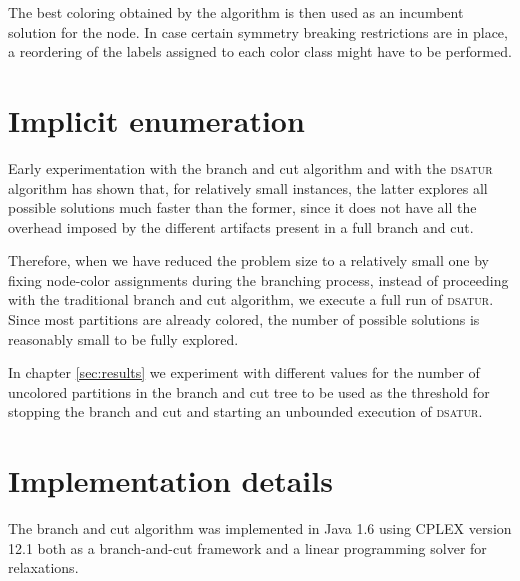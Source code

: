 The best coloring obtained by the algorithm is then used as an incumbent solution for the node. In case certain symmetry breaking restrictions are in place, a reordering of the labels assigned to each color class might have to be performed.

\section{Implicit enumeration}
\label{subsec:alg:implicit}

Early experimentation with the branch and cut algorithm and with the \textsc{dsatur} algorithm has shown that, for relatively small instances, the latter explores all possible solutions much faster than the former, since it does not have all the overhead imposed by the different artifacts present in a full branch and cut.

Therefore, when we have reduced the problem size to a relatively small one by fixing node-color assignments during the branching process, instead of proceeding with the traditional branch and cut algorithm, we execute a full run of \textsc{dsatur}. Since most partitions are already colored, the number of possible solutions is reasonably small to be fully explored.

In chapter \ref{sec:results} we experiment with different values for the number of uncolored partitions in the branch and cut tree to be used as the threshold for stopping the branch and cut and starting an unbounded execution of \textsc{dsatur}.

\section{Implementation details}

The branch and cut algorithm was implemented in Java 1.6 using CPLEX version 12.1 both as a branch-and-cut framework and a linear programming solver for relaxations. 

